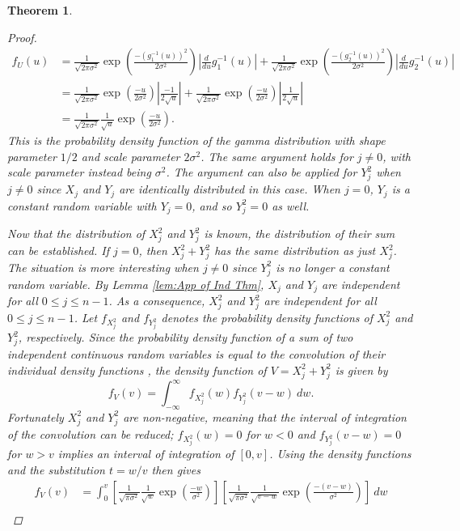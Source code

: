 \documentclass[12pt,notitlepage]{report}
\newcommand{\noiseSD}{\sigma}	%
\newtheorem{theorem}{Theorem}[section]
\begin{document}
\begin{theorem}
\begin{proof}
\begin{align*}
f_U(u) &= \frac{1}{\sqrt{2\pi\noiseSD^2}}\exp\left(\frac{-(g_1^{-1}(u))^2}{2\noiseSD^2}\right)\left|\frac{d}{du}g_1^{-1}(u)\right| + \frac{1}{\sqrt{2\pi\noiseSD^2}}\exp\left(\frac{-(g_2^{-1}(u))^2}{2\noiseSD^2}\right)\left|\frac{d}{du}g_2^{-1}(u)\right| \\
&= \frac{1}{\sqrt{2\pi\noiseSD^2}}\exp\left(\frac{-u}{2\noiseSD^2}\right)\left|\frac{-1}{2\sqrt{u}}\right| + \frac{1}{\sqrt{2\pi\noiseSD^2}}\exp\left(\frac{-u}{2\noiseSD^2}\right)\left|\frac{1}{2\sqrt{u}}\right| \\
&= \frac{1}{\sqrt{2\pi\noiseSD^2}} \frac{1}{\sqrt{u}} \exp\left(\frac{-u}{2\noiseSD^2}\right).
\end{align*}
This is the probability density function of the gamma distribution with shape parameter $1/2$ and scale parameter $2\noiseSD^2$. The same argument holds for $j \neq 0$, with scale parameter instead being $\noiseSD^2$. The argument can also be applied for $Y_j^2$ when $j \neq 0$ since $X_j$ and $Y_j$ are identically distributed in this case. When $j = 0$, $Y_j$ is a constant random variable with $Y_j = 0$, and so $Y_j^2 = 0$ as well. \par 
Now that the distribution of $X_j^2$ and $Y_j^2$ is known, the distribution of their sum can be established. If $j = 0$, then $X_j^2 + Y_j^2$ has the same distribution as just $X_j^2$. The situation is more interesting when $j \neq 0$ since $Y_j^2$ is no longer a constant random variable. By Lemma \ref{lem:App of Ind Thm}, $X_j$ and $Y_j$ are independent for all $0 \leq j \leq n-1$. As a consequence, $X_j^2$ and $Y_j^2$ are independent for all $0 \leq j \leq n-1$. Let $f_{X_j^2}$ and $f_{Y_j^2}$ denotes the probability density functions of $X_j^2$ and $Y_j^2$, respectively. Since the probability density function of a sum of two independent continuous random variables is equal to the convolution of their individual density functions \cite[p.~215]{CasellaBerger02}, the density function of $V = X_j^2 + Y_j^2$ is given by 
\[f_V(v) = \int_{-\infty}^{\infty} f_{X_j^2}(w)f_{Y_j^2}(v-w) \: dw.\]
Fortunately $X_j^2$ and $Y_j^2$ are non-negative, meaning that the interval of integration of the convolution can be reduced; $f_{X_j^2}(w) = 0$ for $w < 0$ and $f_{Y_j^2}(v-w) = 0$ for $w > v$ implies an interval of integration of $[0,v]$. Using the density functions and the substitution $t = w/v$ then gives
\begin{align*}
f_V(v) &= \int_0^v \left[\frac{1}{\sqrt{\pi\noiseSD^2}} \frac{1}{\sqrt{w}} \exp\left(\frac{-w}{\noiseSD^2}\right)\right]\left[\frac{1}{\sqrt{\pi\noiseSD^2}} \frac{1}{\sqrt{v-w}} \exp\left(\frac{-(v-w)}{\noiseSD^2}\right)\right] \: dw \\

\end{align*}
\end{proof}
\end{theorem}
\end{document}
